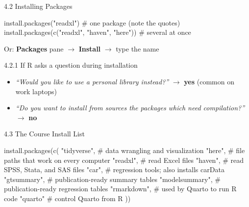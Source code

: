 \documentclass[
  ignorenonframetext,
  aspectratio=169,
]{beamer}
\newenvironment{Shaded}{\begin{snugshade}}{\end{snugshade}}
\newcommand{\CommentTok}[1]{\textcolor[rgb]{0.37,0.37,0.37}{#1}}
\newcommand{\FunctionTok}[1]{\textcolor[rgb]{0.28,0.35,0.67}{#1}}
\newcommand{\NormalTok}[1]{\textcolor[rgb]{0.00,0.23,0.31}{#1}}
\newcommand{\StringTok}[1]{\textcolor[rgb]{0.13,0.47,0.30}{#1}}
\providecommand{\tightlist}{%
  \setlength{\itemsep}{0pt}\setlength{\parskip}{0pt}}
\begin{document}
\begin{frame}[fragile]{4.2 Installing Packages}
\protect{}\label{installing-packages}
\begin{Shaded}
\begin{Highlighting}[]
\FunctionTok{install.packages}\NormalTok{(}\StringTok{"readxl"}\NormalTok{)                       }\CommentTok{\# one package (note the quotes)}
\FunctionTok{install.packages}\NormalTok{(}\FunctionTok{c}\NormalTok{(}\StringTok{"readxl"}\NormalTok{, }\StringTok{"haven"}\NormalTok{, }\StringTok{"here"}\NormalTok{))   }\CommentTok{\# several at once}
\end{Highlighting}
\end{Shaded}

Or: \textbf{Packages} pane \(\rightarrow\) \textbf{Install}
\(\rightarrow\) type the name

\begin{exampleblock}{4.2.1 If R asks a question during installation}
\protect{}\label{if-r-asks-a-question-during-installation}
\begin{itemize}
\tightlist
\item
  \emph{``Would you like to use a personal library instead?''}
  \(\rightarrow\) \textbf{yes} (common on work laptops)
\item
  \emph{``Do you want to install from sources the packages which need
  compilation?''} \(\rightarrow\) \textbf{no}
\end{itemize}
\end{exampleblock}
\end{frame}

\begin{frame}[fragile]{4.3 The Course Install List}
\protect{}\label{sec-course-packages}
\begin{Shaded}
\begin{Highlighting}[]
\FunctionTok{install.packages}\NormalTok{(}\FunctionTok{c}\NormalTok{(}
  \StringTok{"tidyverse"}\NormalTok{,     }\CommentTok{\# data wrangling and visualization}
  \StringTok{"here"}\NormalTok{,          }\CommentTok{\# file paths that work on every computer}
  \StringTok{"readxl"}\NormalTok{,        }\CommentTok{\# read Excel files}
  \StringTok{"haven"}\NormalTok{,         }\CommentTok{\# read SPSS, Stata, and SAS files}
  \StringTok{"car"}\NormalTok{,           }\CommentTok{\# regression tools; also installs carData}
  \StringTok{"gtsummary"}\NormalTok{,     }\CommentTok{\# publication{-}ready summary tables}
  \StringTok{"modelsummary"}\NormalTok{,  }\CommentTok{\# publication{-}ready regression tables}
  \StringTok{"rmarkdown"}\NormalTok{,     }\CommentTok{\# used by Quarto to run R code}
  \StringTok{"quarto"}         \CommentTok{\# control Quarto from R}
\NormalTok{))}
\end{Highlighting}
\end{Shaded}
\end{frame}
\end{document}
